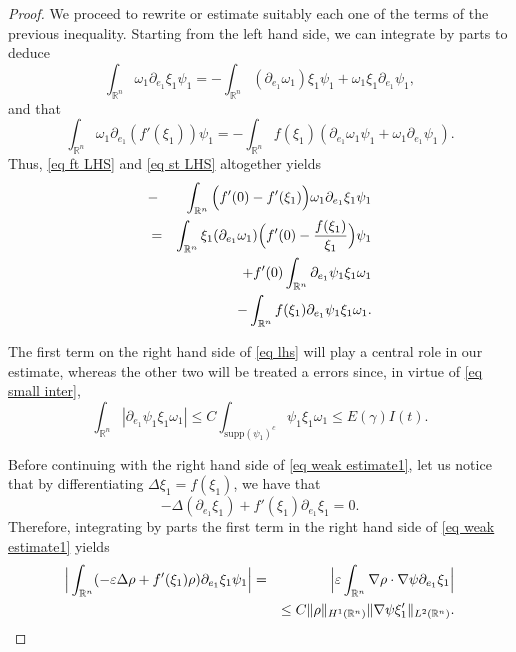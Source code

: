\documentclass[11pt,letterpaper,reqno]{amsart}
\newcommand{\R}{\mathbb{R}}
\newcommand{\e}{\varepsilon}
\theoremstyle{plain}%
\theoremstyle{definition}
\numberwithin{equation}{section}
\numberwithin{figure}{section}
\begin{document}
\begin{proof}
We proceed to rewrite or estimate suitably each one of the terms of the previous inequality. Starting from the left hand side, we can integrate by parts to deduce
\begin{equation}\label{eq ft LHS}
	\int_{\R^n} \omega_1\partial_{e_1} \xi_1 \psi_1 = - \int_{\R^n}  (\partial_{e_1}  \omega_1 )\xi_1 \psi_1+    \omega_1 \xi_1 \partial_{e_1}\psi_1,
\end{equation}
and that
\begin{equation}\label{eq st LHS}
	\int_{\R^n} \omega_{1}\partial_{e_1}(f'(\xi_1))  \psi_1 = - \int_{\R^n} f(\xi_1)(\partial_{e_1}  \omega_{1}  \psi_1+    \omega_{1}  \partial_{e_1}\psi_1).
\end{equation} 
Thus, \eqref{eq ft LHS} and \eqref{eq st LHS} altogether yields
\begin{eqnarray}\notag
&-&\int_{\R^n}\Big(f'(0) - f'(\xi_1)\Big)\omega_{1}\partial_{e_1} \xi_1 \psi_1\\\notag
&=& \int_{\R^n} \xi_1 (\partial_{e_1}  \omega_{1} )\Big( f'(0) -\frac{f(\xi_1)}{\xi_1}\Big)  \psi_1\\\notag
&&+f'(0)\int_{\R^n} \partial_{e_1}\psi_1 \xi_1\omega_{1} \\\label{eq lhs}
&&- \int_{\R^n} f(\xi_1) \partial_{e_1}\psi_1 \xi_1\omega_{1} .
\end{eqnarray}

The first term on the right hand side of \eqref{eq lhs} will play a central role in our estimate, whereas the other two will be treated a errors since, in virtue of \eqref{eq small inter},
\begin{equation}\label{eq inter outside ball}
 \int_{\R^n} |\partial_{e_1}\psi_1 \xi_1\omega_1|\leq C\int_{ \text{supp}(\psi_1)^c} \psi_1 \xi_1\omega_1 \leq E(\gamma)I(t).
\end{equation}

Before continuing with the right hand side of \eqref{eq weak estimate1}, let us notice that by differentiating $\Delta \xi_1 = f(\xi_1)$, we have that
\begin{equation}\label{eq equation derivative}
	-   \Delta (\partial_{e_1} \xi_1)+f'(\xi_1) \partial_{e_1} \xi_1=0.
\end{equation}
Therefore, integrating by parts the first term in the right hand side of \eqref{eq weak estimate1} yields
\begin{eqnarray}\label{eq rho error} 
\Big|	\int_{\R^n} (-  \e \Delta \rho+f'(\xi_1) \rho) \partial_{e_1} \xi_1 \psi_1\Big| &=& \Big| \e\int_{\R^n} \nabla \rho \cdot \nabla \psi \partial_{e_1} \xi_1  \Big|\\\notag
&&\leq  C\Vert \rho\Vert_{H^1(\R^n)} \Vert \nabla \psi  \xi_1' \Vert_{L^2(\R^n)}.
\end{eqnarray}


\end{proof}
\end{document}
